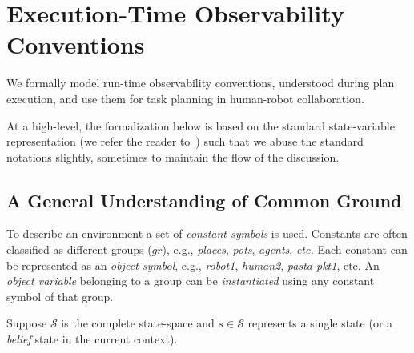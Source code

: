 \documentclass[letterpaper]{article} %
\begin{document}









\section{Execution-Time Observability Conventions}
We formally model run-time observability conventions, understood during plan execution, and use them for task planning in human-robot collaboration. 

At a high-level, the formalization below is based on the standard state-variable representation (we refer the reader to~\cite{naubooks0014222}) such that we abuse the standard notations slightly, sometimes to maintain the flow of the discussion.

\subsection{A General Understanding of Common Ground}
To describe an environment a set of \textit{constant symbols} is used. 
Constants are often classified as different groups ($gr$), e.g., \textit{places}, \textit{pots}, \textit{agents}, \textit{etc.} 
Each constant can be represented as an \textit{object symbol}, e.g., \textit{robot1}, \textit{human2}, \textit{pasta-pkt1}, etc. 
An \textit{object variable} belonging to a group can be \textit{instantiated} using any constant symbol of that group.

Suppose $\mathcal{S}$ is the complete state-space and $s \in \mathcal{S}$ represents a single state (or a \textit{belief} state in the current context).  

\end{document}
